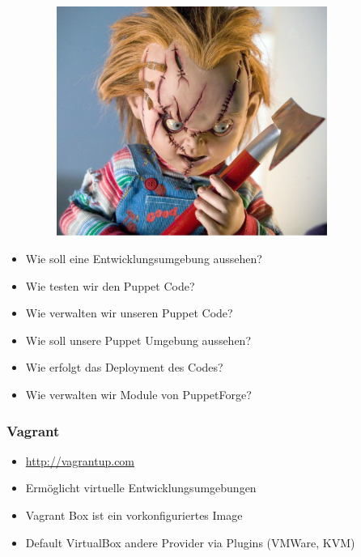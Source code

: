 \documentclass{beamer}
\begin{document}
\begin{frame}
  \begin{figure}[ht]
    \centering
      \includegraphics[height=7.5cm,width=10cm]{../pics/chucky.png}
    \label{fig:stack}
  \end{figure}
\end{frame}

\begin{frame}
  \begin{itemize}
  \item Wie soll eine Entwicklungsumgebung aussehen?
  \item Wie testen wir den Puppet Code?
  \item Wie verwalten wir unseren Puppet Code?
  \item Wie soll unsere Puppet Umgebung aussehen?
  \item Wie erfolgt das Deployment des Codes?
  \item Wie verwalten wir Module von PuppetForge?
  \end{itemize}
\end{frame}

\begin{frame}
\end{frame}

\begin{frame}
  \frametitle{Vagrant}

  \begin{itemize}
  \item \url{http://vagrantup.com}
  \item Ermöglicht virtuelle Entwicklungsumgebungen
  \item Vagrant Box ist ein vorkonfiguriertes Image
  \item Default VirtualBox andere Provider via Plugins (VMWare, KVM)
  \end{itemize}
\end{frame}
\end{document}
